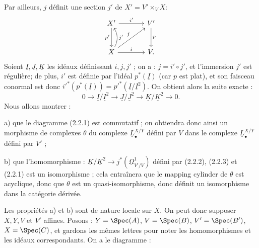 

Par
ailleurs, $j$ définit une section $j'$ de $X'=V'\times_V X$:
\[
\begin{tikzcd}[column sep=large,row sep=large]
X' \arrow[r,"i'"] \arrow[d,"p'"'] & V' \arrow[d,"p"]\\
X \arrow[r,"i"] \arrow[ur,"j"] \arrow[u,"j'"',bend right] & V .
\end{tikzcd}
\]
Soient $\underline{I},\underline{J},\underline{K}$ les idéaux définissant $i,j,j'$ ; on a : $j=i'\circ j'$, et l'immersion $j'$ est régulière; de plus, $i'$ est définie par l'idéal $p^*(\underline{I})$ (car $p$ est plat), et son faisceau conormal est donc $i'^*(p^*(\underline{I}))=p'^*(\underline{I}/\underline{I}^2)$. On obtient alors la suite exacte :
\begin{equation}\tag{2.2.3}
0\longrightarrow \underline{I}/\underline{I}^2\longrightarrow \underline{J}/\underline{J}^2\longrightarrow \underline{K}/\underline{K}^2\longrightarrow0.
\end{equation}
Nous allons montrer :

a) que le diagramme (2.2.1) est commutatif ; on obtiendra donc ainsi un morphisme de complexes $\theta$ du complexe $\underline{L}^{X/Y}_\bullet$ défini par $V$ dans le complexe $\underline{L}^{X/Y}_\bullet$ défini par $V'$ ;

b) que l'homomorphisme : $\underline{K}/\underline{K}^2\longrightarrow j^*(\underline{\Omega}^1_{V'/V})$ défini par (2.2.2), (2.2.3) et (2.2.1) est un isomorphisme ; cela entraînera que le mapping cylinder de $\theta$ est acyclique, donc que $\theta$ est un quasi-isomorphisme, donc définit un isomorphisme dans la catégorie dérivée.

Les propriétés a) et b) sont de nature locale sur $X$. On peut donc supposer $X,Y,V$ et $V'$ affines. Posons : $Y=\Spec(A)$, $V=\Spec(B)$, $V'=\Spec(B')$, $X=\Spec(C)$, et gardons les mêmes lettres pour noter les homomorphismes et les idéaux correspondants. On a le diagramme :
